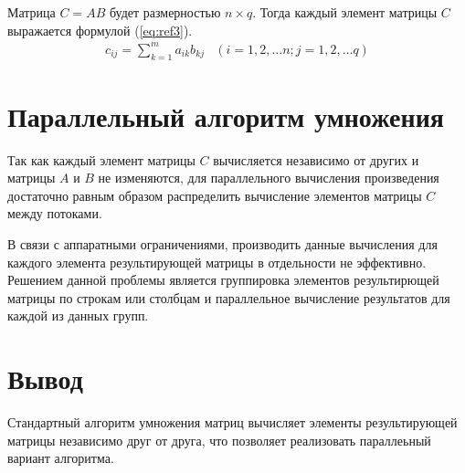Матрица $C = AB$ будет размерностью $n \times q$.
Тогда каждый элемент матрицы $C$ выражается формулой (\ref{eq:ref3}).
\begin{equation}
	\begin{array}{cc}
		c_{ij} = \sum\limits_{k=1}^m a_{ik}b_{kj} & (i=1,2,\dots n; j=1,2,\dots q)
	\end{array}
	\label{eq:ref3}
\end{equation}

\section{Параллельный алгоритм умножения}

Так как каждый элемент матрицы $C$ вычисляется независимо от других \cite{alg} и матрицы $A$ и $B$ не изменяются, для параллельного вычисления произведения достаточно равным образом распределить вычисление элементов матрицы $C$ между потоками.

В связи с аппаратными ограничениями, производить данные вычисления для каждого элемента результирующей матрицы в отдельности не эффективно. Решением данной проблемы является группировка элементов результирющей матрицы по строкам или столбцам и параллельное вычисление результатов для каждой из данных групп.

\section{Вывод}

Стандартный алгоритм умножения матриц вычисляет элементы результирующей матрицы независимо друг от друга, что позволяет реализовать параллеьный вариант алгоритма.
